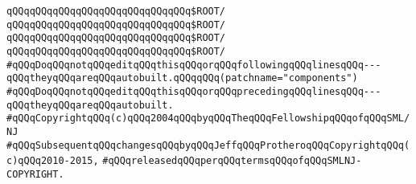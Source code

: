 \verb|qQQqqQQqqQQqqQQqqQQqqQQqqQQqqQQq$ROOT/|\newline
\newline
\verb|qQQqqQQqqQQqqQQqqQQqqQQqqQQqqQQq$ROOT/|\newline
\verb|qQQqqQQqqQQqqQQqqQQqqQQqqQQqqQQq$ROOT/|\newline
\verb|qQQqqQQqqQQqqQQqqQQqqQQqqQQqqQQq$ROOT/|\newline
\newline
\newline
\newline
\verb|#qQQqDoqQQqnotqQQqeditqQQqthisqQQqorqQQqfollowingqQQqlinesqQQq---qQQqtheyqQQqareqQQqautobuilt.qQQqqQQq(patchname="components")|\newline
\verb|#qQQqDoqQQqnotqQQqeditqQQqthisqQQqorqQQqprecedingqQQqlinesqQQq---qQQqtheyqQQqareqQQqautobuilt.|\newline
\newline
\newline
\newline
\verb|#qQQqCopyrightqQQq(c)qQQq2004qQQqbyqQQqTheqQQqFellowshipqQQqofqQQqSML/NJ|\newline
\verb|#qQQqSubsequentqQQqchangesqQQqbyqQQqJeffqQQqProtheroqQQqCopyrightqQQq(c)qQQq2010-2015,|\newline
\verb|#qQQqreleasedqQQqperqQQqtermsqQQqofqQQqSMLNJ-COPYRIGHT.|\newline

